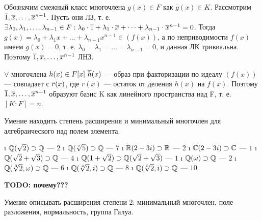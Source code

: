 \begin{solution}
Обозначим смежный класс многочлена \(g(x) \in F\) как \(\overline{g}(x) \in K\). Рассмотрим \(\overline{1}, \overline{x}, \dots, \overline{x}^{n-1}\). Пусть они ЛЗ, т. е. \(\exists \lambda_0, \lambda_1, \dots, \lambda_{n-1} \in F: \lambda_0\cdot\overline{1}+\lambda_1\cdot\overline{x}+\dots+\lambda_{n-1}\cdot\overline{x}^{n-1} = 0\). Тогда \(g(x) = \lambda_0+\lambda_1x+\dots+\lambda_{n-1}x^{n-1} \in (f(x))\), а по неприводимости \(f(x)\) имеем \(g(x) = 0\), т. е. \(\lambda_0 = \lambda_1 = \dots = \lambda_{n-1} = 0\), и данная ЛК тривиальна. Поэтому \(\overline{1}, \overline{x}, \dots, \overline{x}^{n-1}\) ЛНЗ.

\(\forall\) многочлена \(h(x) \in F[x] \ \overline{h}(x)\) --- образ при факторизации по идеалу \((f(x))\) --- совпадает с \(\overline{r}(x)\), где \(r(x)\) --- остаток от деления \(h(x)\) на \(f(x)\). Поэтому \(\overline{1}, \overline{x}, \dots, \overline{x}^{n-1}\) образуют базис K как линейного пространства над F, т. е. \([K:F] = n\).
\end{solution}

\begin{problem}[34(7.9,7.10)] Умение находить степень расширения и минимальный многочлен для алгебраического над полем элемента.
\end{problem}

\begin{solution}

\begin{itemize}
\tightlist
\i
  \(\mathbb{Q}(\sqrt2) \supset \mathbb{Q}\) --- \(2\)
\i
  \(\mathbb{Q}(\sqrt[7]{5}) \supset \mathbb{Q}\) --- \(7\)
\i
  \(\mathbb{R}(2-3i) \supset \mathbb{R}\) --- \(2\)
\i
  \(\mathbb{C}(2-3i) \supset \mathbb{C}\) --- \(1\)
\i
  \(\mathbb{Q}(\sqrt2+\sqrt{3}) \supset \mathbb{Q}\) --- \(4\)
\i
  \(\mathbb{Q}(1+\sqrt2) \supset \mathbb{Q}(\sqrt2+\sqrt{3})\) --- \(1\)
\i
  \(\mathbb{Q}(\omega) \supset \mathbb{Q}\) --- \(2\)
\i
  \(\mathbb{Q}(\sqrt[3]{2}, \omega) \supset \mathbb{Q}\) --- \(6\)
\i
  \(\mathbb{Q}(\sqrt[4]{2}, i) \supset \mathbb{Q}\) --- \(8\)
\i
  \(\mathbb{Q}(\sqrt[5]{2}, i) \supset \mathbb{Q}\) --- \(10\)
\end{itemize}

\bf{TODO: почему???}
\end{solution}

\begin{problem}[6.10,8.9а),9.5] Умение описывать расширения степени 2: минимальный многочлен, поле разложения, нормальность, группа Галуа.
\end{problem}

